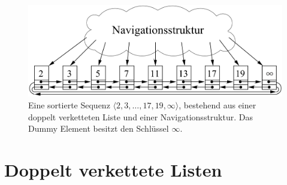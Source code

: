 \begin{figure}
    \begin{center}
        \includegraphics[width=0.8\linewidth]{assets/NavStruct.png}
        \caption{Eine sortierte Sequenz $\langle2, 3, \dots, 17, 19, \infty \rangle$, bestehend aus einer doppelt verketteten Liste und einer Navigationsstruktur. Das Dummy Element besitzt den Schlüssel $\infty$.\\\cite{Sanders:19}}
        \label{fig:NavStruct}
    \end{center}
\end{figure}


\section{Doppelt verkettete Listen}
\label{section:dll}

